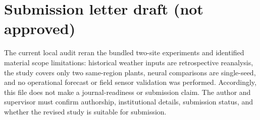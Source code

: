 \documentclass[12pt]{article}
\begin{document}
\section*{Submission letter draft (not approved)}
The current local audit reran the bundled two-site experiments and identified material scope limitations: historical weather inputs are retrospective reanalysis, the study covers only two same-region plants, neural comparisons are single-seed, and no operational forecast or field sensor validation was performed. Accordingly, this file does not make a journal-readiness or submission claim. The author and supervisor must confirm authorship, institutional details, submission status, and whether the revised study is suitable for submission.
\end{document}
